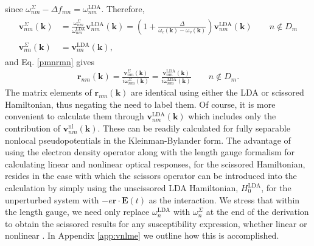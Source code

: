 since $\omega^\Sigma_{nm}-\Delta f_{mn}=\omega^{\mathrm{LDA}}_{nm}$. Therefore,
\begin{align}\label{chon.9}
\begin{split}
\mathbf{v}^\Sigma_{nm}(\mathbf{k}) &=
\frac{\omega^\Sigma_{nm}}{\omega^{\mathrm{LDA}}_{nm}}
\mathbf{v}^\mathrm{LDA}_{nm}(\mathbf{k})
= \left(
1 + \frac{\Delta}{\omega_c(\mathbf{k})-\omega_v(\mathbf{k})}
\right)
\mathbf{v}^\mathrm{LDA}_{nm}(\mathbf{k})\qquad n\notin D_{m}\\\\
\mathbf{v}^\Sigma_{nn}(\mathbf{k}) &= \mathbf{v}^\mathrm{LDA}_{nn}(\mathbf{k}),
\end{split}
\end{align} 
and Eq. \eqref{pmnrmn} gives
\begin{align}\label{chon.10}
\mathbf{r}_{nm}(\mathbf{k})
= \frac{\mathbf{v}^\Sigma_{nm}(\mathbf{k})}{i\omega^\Sigma_{nm}(\mathbf{k})}
= \frac{\mathbf{v}^\mathrm{LDA}_{nm}(\mathbf{k})}
{i\omega^{\mathrm{LDA}}_{nm}(\mathbf{k})} \qquad n\notin D_{m}.
\end{align}
The matrix elements of $\mathbf{r}_{nm}(\mathbf{k})$ are identical using either
the LDA or scissored Hamiltonian, thus negating the need to label them. Of
course, it is more convenient to calculate them through
$\mathbf{v}^\mathrm{LDA}_{nm}(\mathbf{k})$ which includes only the contribution
of $\mathbf{v}^\mathrm{nl}_{nm}(\mathbf{k})$. These can be readily calculated
for fully separable nonlocal pseudopotentials in the Kleinman-Bylander
form.\cite{olevano, mottaCMS10, kleinmanPRL82, adolphPRB96} The advantage of
using the electron density operator along with the length gauge formalism for
calculating linear and nonlinear optical responses, for the scissored
Hamiltonian, resides in the ease with which the scissors operator can be
introduced into the calculation by simply using the unscissored LDA Hamiltonian,
$H_0^{\mathrm{LDA}}$, for the unperturbed system with $-e\mathbf{r}\cdot
\mathbf{E}(t)$ as the interaction. We stress that within the length gauge, we
need only replace $\omega^{\mathrm{LDA}}_{n}$ with $\omega_{n}^{\Sigma}$ at the
end of the derivation to obtain the scissored results for any susceptibility
expression, whether linear or nonlinear \cite{nastosPRB05}. In Appendix
\ref{app:vnlme} we outline how this is accomplished.


